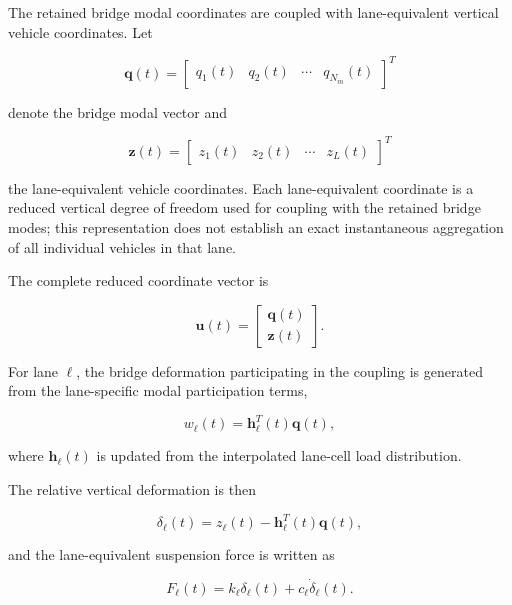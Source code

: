 \documentclass[journal]{IEEEtran}
\begin{document}
The retained bridge
modal coordinates are coupled with lane-equivalent vertical vehicle
coordinates. Let

\begin{equation}
\mathbf{q}(t)
=
\begin{bmatrix}
q_1(t) &
q_2(t) &
\cdots &
q_{N_m}(t)
\end{bmatrix}^{T}
\end{equation}

denote the bridge modal
vector and

\begin{equation}
\mathbf{z}(t)
=
\begin{bmatrix}
z_1(t) &
z_2(t) &
\cdots &
z_L(t)
\end{bmatrix}^{T}
\end{equation}

the lane-equivalent vehicle coordinates. Each lane-equivalent coordinate is a reduced vertical degree of freedom used for coupling with the retained bridge modes; this representation does not establish an exact instantaneous aggregation of all individual vehicles in that lane.

The complete reduced
coordinate vector is

\begin{equation}
\mathbf{u}(t)
=
\begin{bmatrix}
\mathbf{q}(t) \\
\mathbf{z}(t)
\end{bmatrix}.
\end{equation}

For lane $\ell$, the bridge
deformation participating in the coupling is generated from the lane-specific
modal participation terms,

\begin{equation}
w_{\ell}(t)
=
\mathbf{h}_{\ell}^{T}(t)
\mathbf{q}(t),
\end{equation}

where $\mathbf{h}_{\ell}(t)$ is updated from the
interpolated lane-cell load distribution.

The relative vertical
deformation is then

\begin{equation}
\delta_{\ell}(t)
=
z_{\ell}(t)
-
\mathbf{h}_{\ell}^{T}(t)
\mathbf{q}(t),
\end{equation}

and the lane-equivalent
suspension force is written as

\begin{equation}
F_{\ell}(t)
=
k_{\ell}\delta_{\ell}(t)
+
c_{\ell}\dot{\delta}_{\ell}(t).
\end{equation}
\end{document}
